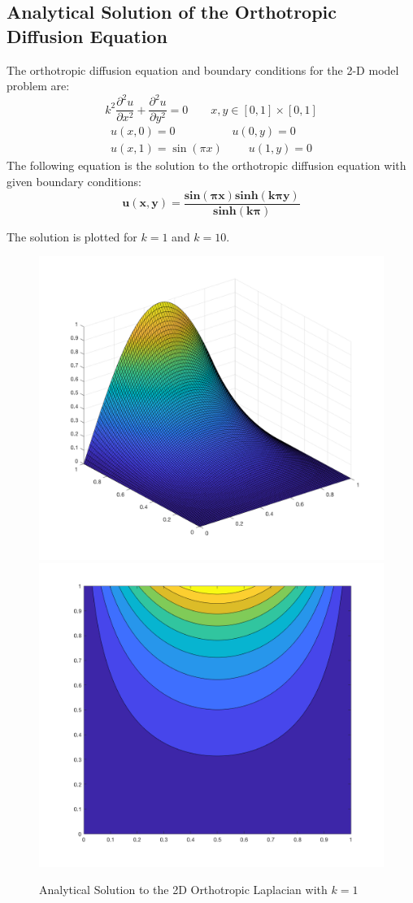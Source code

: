 \documentclass[10pt]{article}		%
\numberwithin{equation}{section}
\newcommand{\psder}[2]{\dfrac{\partial^2#1}{\partial#2^2}}		%
\begin{document}
\subsection{Analytical Solution of the Orthotropic Diffusion Equation}

The orthotropic diffusion equation and boundary conditions for the 2-D model problem are:
\begin{equation}
k^2\psder{u}{x} + \psder{u}{y} = 0 \qquad x,y \in [0, 1] \times [0, 1]
\end{equation}
\begin{equation}
\begin{split}
u(x, 0) = 0 \qquad \qquad \quad u(0, y) = 0  \\
u(x, 1) = \sin(\pi x) \qquad \; u(1, y) = 0
\end{split}
\end{equation}
The following equation is the solution to the orthotropic diffusion equation with given boundary conditions:
\begin{equation}
\mathbf{u(x, y) = \frac{sin(\pi x) sinh(k\pi y)}{sinh(k\pi)}}
\end{equation}

The solution is plotted for $k=1$ and $k=10$.

\begin{figure}[H]
	\begin{center}
		\includegraphics[width = 0.39\linewidth]{analytical_surface_k_1}
		\includegraphics[width = 0.39\linewidth]{analytical_contour_k_1}
		\caption{Analytical Solution to the 2D Orthotropic Laplacian with $k = 1$}
	\end{center}
\end{figure}
\end{document}
